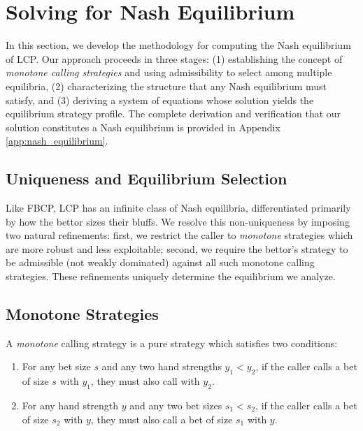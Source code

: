 \documentclass[../../main/main.tex]{subfiles}
\begin{document}
\section{Solving for Nash Equilibrium}
\label{sec:solving_lcp}

In this section, we develop the methodology for computing the Nash equilibrium of LCP. Our approach proceeds in three stages: (1) establishing the concept of \textit{monotone calling strategies} and using admissibility to select among multiple equilibria, (2) characterizing the structure that any Nash equilibrium must satisfy, and (3) deriving a system of equations whose solution yields the equilibrium strategy profile. The complete derivation and verification that our solution constitutes a Nash equilibrium is provided in Appendix \ref{app:nash_equilibrium}.

\subsection{Uniqueness and Equilibrium Selection}

Like FBCP, LCP has an infinite class of Nash equilibria, differentiated primarily by how the bettor sizes their bluffs. We resolve this non-uniqueness by imposing two natural refinements: first, we restrict the caller to \textit{monotone} strategies which are more robust and less exploitable; second, we require the bettor's strategy to be admissible (not weakly dominated) against all such monotone calling strategies. These refinements uniquely determine the equilibrium we analyze.

\subsection{Monotone Strategies}
\label{subsec:monotone_strategies}

\begin{definition}
    A \textit{monotone} calling strategy is a pure strategy which satisfies two conditions:
    \begin{enumerate}
        \item For any bet size $s$ and any two hand strengths $y_1 < y_2$, if the caller calls a bet of size $s$ with $y_1$, they must also call with $y_2$.
        \item For any hand strength $y$ and any two bet sizes $s_1 < s_2$, if the caller calls a bet of size $s_2$ with $y$, they must also call a bet of size $s_1$ with $y$.
    \end{enumerate}
\end{definition}
\end{document}
